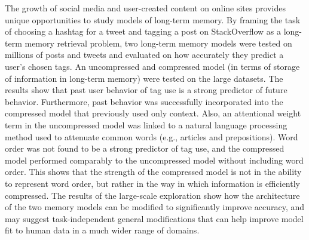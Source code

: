 \documentclass[answers,12pt]{exam}
\begin{document}
\begin{questions}
\begin{solution}
The growth of social media and user-created content on online sites provides unique opportunities to study models of long-term memory.
By framing the task of choosing a hashtag for a tweet and tagging a post on StackOverflow as a long-term memory retrieval problem,
two long-term memory models were tested on millions of posts and tweets and evaluated on how accurately they predict a user's chosen tags.
An uncompressed and compressed model (in terms of storage of information in long-term memory) were tested on the large datasets.
The results show that past user behavior of tag use is a strong predictor of future behavior.
Furthermore, past behavior was successfully incorporated into the compressed model that previously used only context.
Also, an attentional weight term in the uncompressed model was linked to a natural language processing method used to attenuate common words (e.g., articles and prepositions).
Word order was not found to be a strong predictor of tag use, and the compressed model performed comparably to the uncompressed model without including word order.
This shows that the strength of the compressed model is not in the ability to represent word order, but rather in the way in which information is efficiently compressed.
The results of the large-scale exploration show how the architecture of the two memory models can be modified to significantly improve accuracy,
and may suggest task-independent general modifications that can help improve model fit to human data in a much wider range of domains.



\end{solution}

\end{questions}
\end{document}
